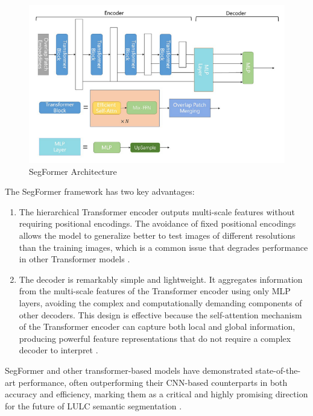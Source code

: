 \documentclass{report}
\begin{document}
\begin{figure}[H]
    \centering
    \includegraphics[width=1\linewidth]{Images_from_other_sources/SegFormer_Architecture.png}
    \caption{SegFormer Architecture \parencites[p.~865]{YangEtAlWaterSegformerlightweightmodelwaterbodyinformationextractionremotesensingimages2023}}
    \label{fig:SegFormer_Architecture}
\end{figure}
\par
The SegFormer framework has two key advantages:
\begin{enumerate}
\item The hierarchical Transformer encoder outputs multi-scale features without requiring positional encodings. The avoidance of fixed positional encodings allows the model to generalize better to test images of different resolutions than the training images, which is a common issue that degrades performance in other Transformer models \parencites[p.~4]{XieEtAlSegFormerSimpleEfficientDesignSemanticSegmentationTransformers2021}.
\item The decoder is remarkably simple and lightweight. It aggregates information from the multi-scale features of the Transformer encoder using only MLP layers, avoiding the complex and computationally demanding components of other decoders. This design is effective because the self-attention mechanism of the Transformer encoder can capture both local and global information, producing powerful feature representations that do not require a complex decoder to interpret \parencites[p.~5]{XieEtAlSegFormerSimpleEfficientDesignSemanticSegmentationTransformers2021}.
\end{enumerate}
SegFormer and other transformer-based models have demonstrated state-of-the-art performance, often outperforming their CNN-based counterparts in both accuracy and efficiency, marking them as a critical and highly promising direction for the future of LULC semantic segmentation \parencites[p.~25;]{LeiEtAlDeeplearningimplementationimagesegmentationagriculturalapplicationscomprehensivereview2024}[p.~1]{XieEtAlSegFormerSimpleEfficientDesignSemanticSegmentationTransformers2021}.
\end{document}
